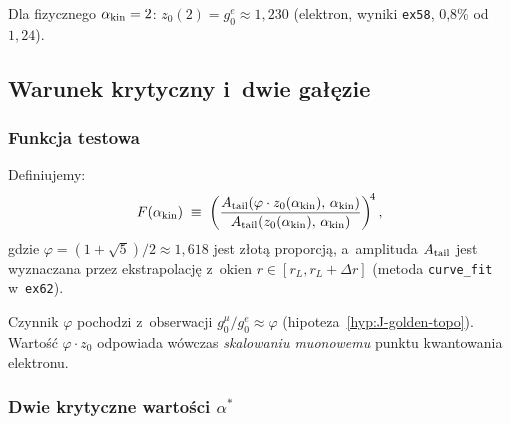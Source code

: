 \begin{remark}
Dla fizycznego $\alpha_{\rm kin} = 2$:
$z_0(2) = g_0^e \approx 1{,}230$ (elektron, wyniki \texttt{ex58}, 0{,}8\% od $1{,}24$).
\end{remark}

\subsection{Warunek krytyczny i~dwie gałęzie}
\label{app:L-warunek}

\subsubsection{Funkcja testowa}

Definiujemy:
\begin{equation}\label{eq:L-F-def}
  F(\alpha_{\rm kin}) \;\equiv\;
  \left(\frac{A_{\rm tail}(\varphi\cdot z_0(\alpha_{\rm kin}),\,\alpha_{\rm kin})}
              {A_{\rm tail}(z_0(\alpha_{\rm kin}),\,\alpha_{\rm kin})}\right)^{\!4},
\end{equation}
gdzie $\varphi = (1+\sqrt{5})/2 \approx 1{,}618$ jest złotą proporcją,
a~amplituda $A_{\rm tail}$ jest wyznaczana przez ekstrapolację z~okien
$r \in [r_L, r_L + \Delta r]$ (metoda \texttt{curve\_fit} w~\texttt{ex62}).

\begin{remark}
Czynnik $\varphi$ pochodzi z~obserwacji $g_0^\mu / g_0^e \approx \varphi$
(hipoteza~\ref{hyp:J-golden-topo}). Wartość $\varphi\cdot z_0$ odpowiada
wówczas \emph{skalowaniu muonowemu} punktu kwantowania elektronu.
\end{remark}

\subsubsection{Dwie krytyczne wartości $\alpha^*$}

